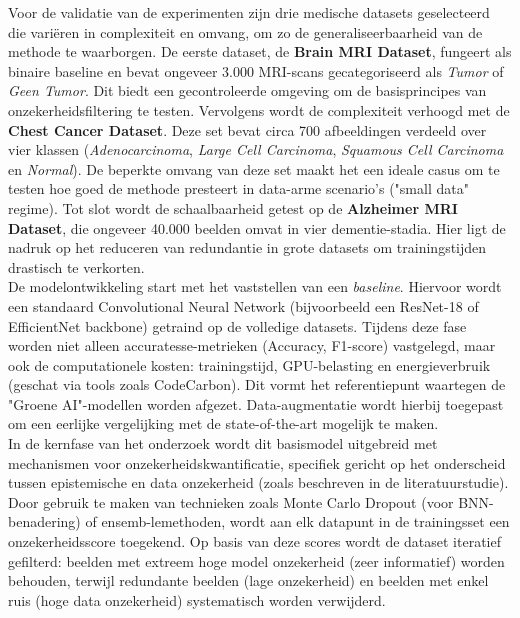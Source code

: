 Voor de validatie van de experimenten zijn drie medische datasets geselecteerd die variëren in complexiteit en omvang, om zo de generaliseerbaarheid van de methode te waarborgen. De eerste dataset, de \textbf{Brain MRI Dataset}, fungeert als binaire baseline en bevat ongeveer 3.000 MRI-scans gecategoriseerd als \textit{Tumor} of \textit{Geen Tumor}. Dit biedt een gecontroleerde omgeving om de basisprincipes van onzekerheidsfiltering te testen. Vervolgens wordt de complexiteit verhoogd met de \textbf{Chest Cancer Dataset}. Deze set bevat circa 700 afbeeldingen verdeeld over vier klassen (\textit{Adenocarcinoma}, \textit{Large Cell Carcinoma}, \textit{Squamous Cell Carcinoma} en \textit{Normal}). De beperkte omvang van deze set maakt het een ideale casus om te testen hoe goed de methode presteert in data-arme scenario's ("small data" regime). Tot slot wordt de schaalbaarheid getest op de \textbf{Alzheimer MRI Dataset}, die ongeveer 40.000 beelden omvat in vier dementie-stadia. Hier ligt de nadruk op het reduceren van redundantie in grote datasets om trainingstijden drastisch te verkorten.\\

De modelontwikkeling start met het vaststellen van een \textit{baseline}. Hiervoor wordt een standaard Convolutional Neural Network (bijvoorbeeld een ResNet-18 of EfficientNet backbone) getraind op de volledige datasets. Tijdens deze fase worden niet alleen accuratesse-metrieken (Accuracy, F1-score) vastgelegd, maar ook de computationele kosten: trainingstijd, GPU-belasting en energieverbruik (geschat via tools zoals CodeCarbon). Dit vormt het referentiepunt waartegen de "Groene AI"-modellen worden afgezet. Data-augmentatie wordt hierbij toegepast om een eerlijke vergelijking met de state-of-the-art mogelijk te maken.\\

In de kernfase van het onderzoek wordt dit basismodel uitgebreid met mechanismen voor onzekerheidskwantificatie, specifiek gericht op het onderscheid tussen epistemische en data onzekerheid (zoals beschreven in de literatuurstudie). Door gebruik te maken van technieken zoals Monte Carlo Dropout (voor BNN-benadering) of ensemb\newline-lemethoden, wordt aan elk datapunt in de trainingsset een onzekerheidsscore toegekend. Op basis van deze scores wordt de dataset iteratief gefilterd: beelden met extreem hoge model onzekerheid (zeer informatief) worden behouden, terwijl redundante beelden (lage onzekerheid) en beelden met enkel ruis (hoge data onzekerheid) systematisch worden verwijderd. \\

